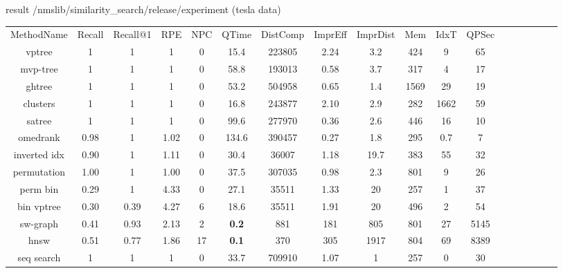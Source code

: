 \documentclass[xcolor=dvipsnames, aspectratio=1610]{beamer}
\newcommand{\alertA}[1]{\color{alertAcolor}#1\color{Black}}
\begin{document}
\begin{frame}[fragile]{result /nmslib/similarity_search/release/experiment (tesla data)} 
\linespread{1}\tiny{
\begin{minipage}{0.99\textwidth}  
{\fontsize{7}{2} \selectfont
\begin{tabular}{cccccccccccccccccc}
MethodName   & Recall & Recall@1 & RPE         & NPC & QTime & DistComp & ImprEff & ImprDist & Mem & IdxT & QPSec \\
vptree       & 1      & 1        & 1           & 0   & 15.4  & 223805   & 2.24    & 3.2      & 424 & 9     &  65  \\
mvp-tree     & 1      & 1        & 1           & 0   & 58.8  & 193013   & 0.58    & 3.7      & 317 & 4     &  17  \\
ghtree       & 1      & 1        & 1           & 0   & 53.2  & 504958   & 0.65    & 1.4     & 1569 & 29    &  19  \\
 clusters    & 1      & 1        & 1           & 0   & 16.8  & 243877   & 2.10    & 2.9      & 282 & 1662  &  59  \\
satree       & 1      & 1        & 1           & 0   & 99.6  & 277970   & 0.36    & 2.6      & 446 & 16    &  10  \\
omedrank     & 0.98   & 1        & 1.02        & 0   & 134.6 & 390457   & 0.27    & 1.8      & 295 & 0.7   &  7  \\
inverted idx & 0.90   & 1        & 1.11        & 0   & 30.4  & 36007    & 1.18    & 19.7     & 383 & 55    &  32 \\
permutation  & 1.00   & 1        & 1.00        & 0   & 37.5  & 307035   & 0.98    & 2.3      & 801 & 9     &  26 \\
perm bin     & 0.29   & 1        & 4.33        & 0   & 27.1  & 35511    & 1.33    & 20       & 257 & 1     &  37  \\
bin vptree   & 0.30   & 0.39     & 4.27        & 6   & 18.6  & 35511    & 1.91    & 20       & 496 & 2     &  54  \\
sw-graph     & 0.41   & 0.93     & 2.13        & 2   & \alertA{\bf{0.2}}   & 881      & 181     & 805      & 801 & 27    &  5145 \\
hnsw         & 0.51   & 0.77     & 1.86        & 17  & \alertA{\bf{0.1}}   & 370      & 305     & 1917     & 804 & 69    &  8389  \\
seq search   & 1      & 1        & 1           & 0   & 33.7  & 709910   & 1.07    & 1        & 257 & 0     &  30  \\
\end{tabular}
}
\end{minipage}}
\end{frame}
\end{document}
